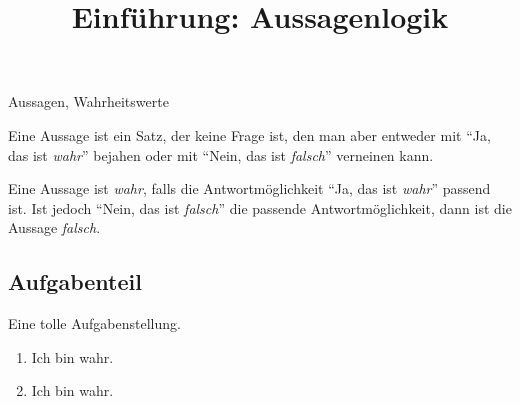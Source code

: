 \documentclass{uebungsblatt}
\title{Einführung: Aussagenlogik}
\begin{document}
\maketitle
\begin{contents}
    Aussagen, Wahrheitswerte
\end{contents}


\begin{definition}
    Eine Aussage ist ein Satz, der keine Frage ist, den man aber entweder mit 
    \enquote{Ja, das ist \emph{wahr}} bejahen oder mit \enquote{Nein, das ist \emph{falsch}} 
    verneinen kann.
\end{definition}

\begin{definition}
    Eine Aussage ist \emph{wahr}, falls die Antwortmöglichkeit \enquote{Ja, das ist \emph{wahr}}
    passend ist. Ist jedoch \enquote{Nein, das ist \emph{falsch}} die passende
    Antwortmöglichkeit, dann ist die Aussage \emph{falsch}.
\end{definition}

\subsection*{Aufgabenteil}

\begin{exercise}
    Eine tolle Aufgabenstellung.
    \begin{multicols}{2}
        \begin{enumerate}[label=\alph*)]
            \item Ich bin wahr.
            \item Ich bin wahr.
        \end{enumerate}
    \end{multicols}
\end{exercise}

\end{document}
